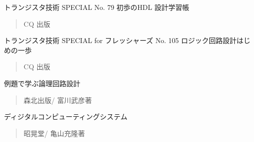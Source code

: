 \documentclass[letterpaper,10pt,dvipdfmx]{sphinxmanual}
\begin{document}
トランジスタ技術 SPECIAL No. 79 初歩のHDL 設計学習帳
\begin{quote}

CQ 出版
\end{quote}

トランジスタ技術 SPECIAL for フレッシャーズ No. 105 ロジック回路設計はじめの一歩
\begin{quote}

CQ 出版
\end{quote}

例題で学ぶ論理回路設計
\begin{quote}

森北出版/ 富川武彦著
\end{quote}

ディジタルコンピューティングシステム
\begin{quote}

昭晃堂/ 亀山充隆著
\end{quote}



\renewcommand{\indexname}{索引}
\printindex
\end{document}
